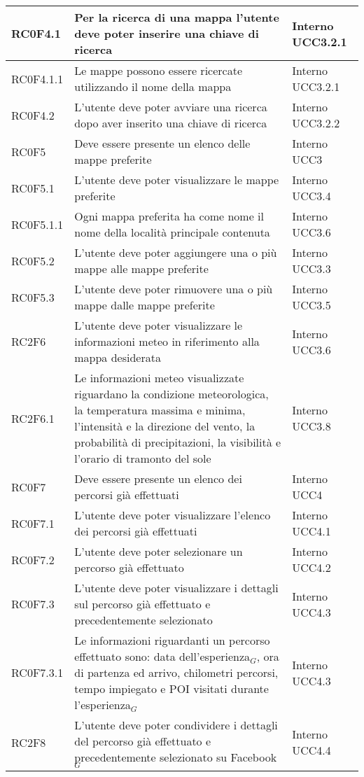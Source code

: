 \begin{center}
\begin{longtable}{|l|p{7cm}|p{1.7cm}|}
RC0F4.1		& Per la ricerca di una mappa l'utente deve poter inserire una chiave di ricerca & Interno UCC3.2.1 \\\hline
RC0F4.1.1	& Le mappe possono essere ricercate utilizzando il nome della mappa & Interno UCC3.2.1 \\\hline
RC0F4.2		& L'utente deve poter avviare una ricerca dopo aver inserito una chiave di ricerca & Interno UCC3.2.2 \\\hline
RC0F5 		& Deve essere presente un elenco delle mappe preferite & Interno UCC3 \\\hline
RC0F5.1 	& L'utente deve poter visualizzare le mappe preferite & Interno UCC3.4 \\\hline
RC0F5.1.1	& Ogni mappa preferita ha come nome il nome della località principale contenuta & Interno UCC3.6 \\\hline
RC0F5.2 	& L'utente deve poter aggiungere una o più mappe alle mappe preferite & Interno UCC3.3 \\\hline
RC0F5.3		& L'utente deve poter rimuovere una o più mappe dalle mappe preferite & Interno UCC3.5 \\\hline
RC2F6 		& L'utente deve poter visualizzare le informazioni meteo in riferimento alla mappa desiderata & Interno UCC3.6 \\\hline
RC2F6.1		& Le informazioni meteo visualizzate riguardano la condizione meteorologica, la temperatura massima e minima, l'intensità e la direzione del vento, la probabilità di precipitazioni, la visibilità e l'orario di tramonto del sole & Interno UCC3.8 \\\hline
RC0F7 		& Deve essere presente un elenco dei percorsi già effettuati & Interno UCC4 \\\hline
RC0F7.1		& L'utente deve poter visualizzare l'elenco dei percorsi già effettuati & Interno UCC4.1 \\\hline
RC0F7.2		& L'utente deve poter selezionare un percorso già effettuato & Interno UCC4.2 \\\hline
RC0F7.3		& L'utente deve poter visualizzare i dettagli sul percorso già effettuato e precedentemente selezionato & Interno UCC4.3 \\\hline
RC0F7.3.1	& Le informazioni riguardanti un percorso effettuato sono: data dell'esperienza$_{G}$, ora di partenza ed arrivo, chilometri percorsi, tempo impiegato e POI visitati durante l'esperienza$_{G}$ & Interno UCC4.3 \\\hline
RC2F8		& L'utente deve poter condividere i dettagli del percorso già effettuato e precedentemente selezionato su Facebook$_{G}$ & Interno UCC4.4 \\\hline

\end{longtable}
\end{center}
